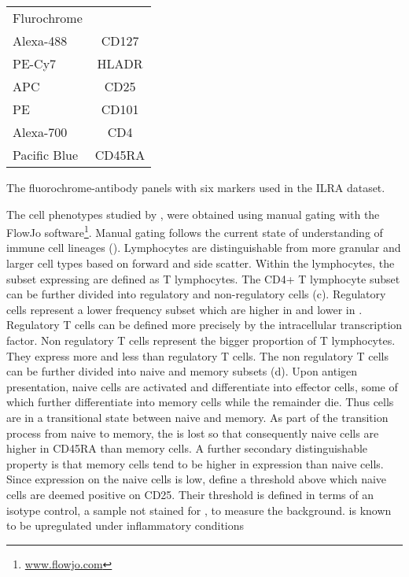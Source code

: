 \begin{table}[h]
\centering
\begin{tabular}{lc}
\rowcolor{Gray}
Flurochrome  & \\
Alexa-488    & CD127\\
PE-Cy7       & HLADR\\
APC          & CD25\\
PE           & CD101\\
Alexa-700    & CD4\\
Pacific Blue & CD45RA\\
\end{tabular}
{ The fluorochrome-antibody panels with six markers used in the ILRA dataset.  }
{
}
\end{table}



The cell phenotypes studied by \citet{Dendrou:2009dv}, were obtained using manual gating with the FlowJo software\footnote{\url{www.flowjo.com}}.
Manual gating follows the current state of understanding of immune cell lineages ().
Lymphocytes are distinguishable from more granular and larger cell types based on forward and side scatter.
Within the lymphocytes, the subset expressing  are defined as T lymphocytes.
The CD4+ T lymphocyte subset can be further divided into regulatory and non-regulatory cells (c).
Regulatory cells represent a lower frequency subset which are higher in  and lower in .
Regulatory T cells can be defined more precisely by the intracellular  transcription factor.
Non regulatory T cells represent the bigger proportion of T lymphocytes.
They express more  and less  than regulatory T cells.
The non regulatory T cells can be further divided into naive and memory subsets (d).  
Upon antigen presentation, naive cells are activated and differentiate into effector cells, some of which further differentiate into memory cells
while the remainder die.
Thus cells are in a transitional state between naive and memory.  
As part of the transition process from naive to memory, the  is lost so that consequently naive cells are higher in CD45RA than memory cells.
A further secondary distinguishable property is that memory cells tend to be higher in  expression than naive cells.
Since  expression on the naive cells is low, \citet{Dendrou:2009dv} define a threshold above which naive cells are deemed positive on CD25.
Their threshold is defined in terms of an isotype control, a sample not stained for , to measure the background.
 is known to be upregulated under inflammatory conditions

